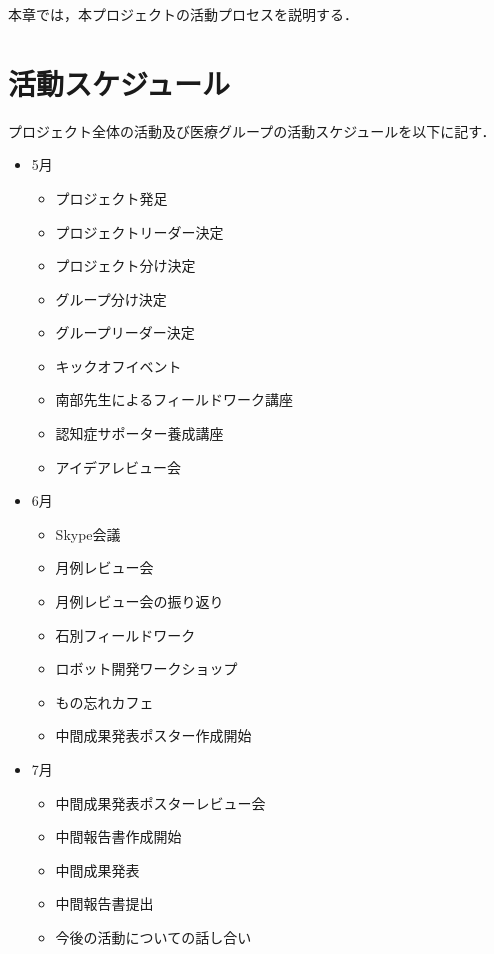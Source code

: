 \documentclass[../report]{subfiles}
\begin{document}
本章では，本プロジェクトの活動プロセスを説明する．

\section{活動スケジュール}
プロジェクト全体の活動及び医療グループの活動スケジュールを以下に記す．
\begin{itemize}
    \item[] 5月
    \begin{itemize}
        \item プロジェクト発足
        \item プロジェクトリーダー決定
        \item プロジェクト分け決定
        \item グループ分け決定
        \item グループリーダー決定
        \item キックオフイベント
        \item 南部先生によるフィールドワーク講座
        \item 認知症サポーター養成講座
        \item アイデアレビュー会
    \end{itemize}
    \item[] 6月
    \begin{itemize}
        \item Skype会議
        \item 月例レビュー会
        \item 月例レビュー会の振り返り
        \item 石別フィールドワーク
        \item ロボット開発ワークショップ
        \item もの忘れカフェ
        \item 中間成果発表ポスター作成開始
    \end{itemize}
    \item[] 7月
    \begin{itemize}
        \item 中間成果発表ポスターレビュー会
        \item 中間報告書作成開始
        \item 中間成果発表
        \item 中間報告書提出
        \item 今後の活動についての話し合い
    \end{itemize}
\end{itemize}
\end{document}
